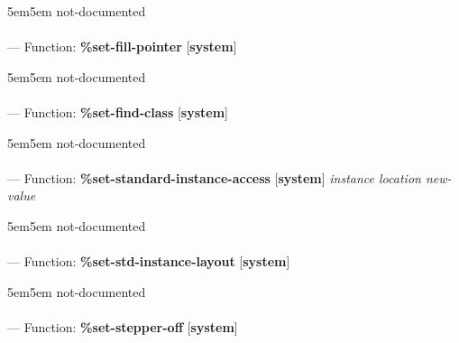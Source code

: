\begin{adjustwidth}{5em}{5em}
not-documented
\end{adjustwidth}

\paragraph{}
\label{SYSTEM:SET-FILL-POINTER}
--- Function: \textbf{\%set-fill-pointer} [\textbf{system}] \textit{}

\begin{adjustwidth}{5em}{5em}
not-documented
\end{adjustwidth}

\paragraph{}
\label{SYSTEM:SET-FIND-CLASS}
--- Function: \textbf{\%set-find-class} [\textbf{system}] \textit{}

\begin{adjustwidth}{5em}{5em}
not-documented
\end{adjustwidth}

\paragraph{}
\label{SYSTEM:SET-STANDARD-INSTANCE-ACCESS}
--- Function: \textbf{\%set-standard-instance-access} [\textbf{system}] \textit{instance location new-value}

\begin{adjustwidth}{5em}{5em}
not-documented
\end{adjustwidth}

\paragraph{}
\label{SYSTEM:SET-STD-INSTANCE-LAYOUT}
--- Function: \textbf{\%set-std-instance-layout} [\textbf{system}] \textit{}

\begin{adjustwidth}{5em}{5em}
not-documented
\end{adjustwidth}

\paragraph{}
\label{SYSTEM:SET-STEPPER-OFF}
--- Function: \textbf{\%set-stepper-off} [\textbf{system}] \textit{}

